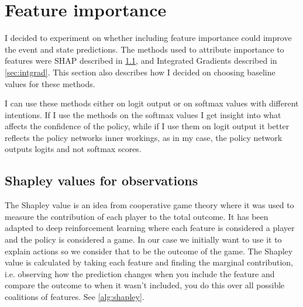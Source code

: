 \documentclass[UKenglish]{uiomasterthesis}
\begin{document}
%

\section{Feature importance}
\label{sec:feat_imp_meth}
I decided to experiment on whether including feature importance could improve the event and state predictions. The methods used to attribute importance to features were SHAP described in \cref{sec:shap_meth}, and Integrated Gradients described in \cref{sec:intgrad}. This section also describes how I decided on choosing baseline values for these methods.

I can use these methods either on logit output or on softmax values with different intentions. If I use the methods on the softmax values I get insight into what affects the confidence of the policy, while if I use them on logit output it better reflects the policy networks inner workings, as in my case, the policy network outputs logits and not softmax scores.

\subsection{Shapley values for observations}
\label{sec:shap_meth}
The Shapley value is an idea from cooperative game theory where it was used to measure the contribution of each player to the total outcome. It has been adapted to deep reinforcement learning where each feature is considered a player and the policy is considered a game. In our case we initially want to use it to explain actions so we consider that to be the outcome of the game. The Shapley value is calculated by taking each feature and finding the marginal contribution, i.e. observing how the prediction changes when you include the feature and compare the outcome to when it wasn't included, you do this over all possible coalitions of features. See \cref{alg:shapley}.
\end{document}
